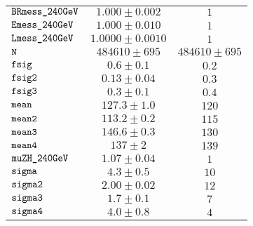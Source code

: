 \begin{tabular}{lcc}
$\verb+BRmess_240GeV+ $ & $  1.000\pm 0.002$ & $ 1$\\
$\verb+Emess_240GeV+ $ & $  1.000\pm 0.010$ & $ 1$\\
$\verb+Lmess_240GeV+ $ & $  1.0000\pm 0.0010$ & $ 1$\\
$\verb+N+ $ & $  484610\pm 695$ & $ 484610\pm 695$\\
$\verb+fsig+ $ & $  0.6\pm 0.1$ & $ 0.2$\\
$\verb+fsig2+ $ & $  0.13\pm 0.04$ & $ 0.3$\\
$\verb+fsig3+ $ & $  0.3\pm 0.1$ & $ 0.4$\\
$\verb+mean+ $ & $  127.3\pm 1.0$ & $ 120$\\
$\verb+mean2+ $ & $  113.2\pm 0.2$ & $ 115$\\
$\verb+mean3+ $ & $  146.6\pm 0.3$ & $ 130$\\
$\verb+mean4+ $ & $  137\pm 2$ & $ 139$\\
$\verb+muZH_240GeV+ $ & $  1.07\pm 0.04$ & $ 1$\\
$\verb+sigma+ $ & $  4.3\pm 0.5$ & $ 10$\\
$\verb+sigma2+ $ & $  2.00\pm 0.02$ & $ 12$\\
$\verb+sigma3+ $ & $  1.7\pm 0.1$ & $ 7$\\
$\verb+sigma4+ $ & $  4.0\pm 0.8$ & $ 4$\\
\end{tabular}
